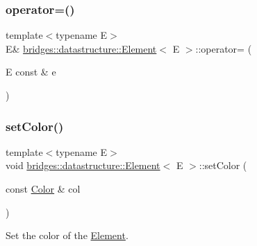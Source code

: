\mbox{\label{classbridges_1_1datastructure_1_1_element_a18ffc753328275e95bb1ee967f88a00a}} 
\subsubsection{\texorpdfstring{operator=()}{operator=()}\hspace{0.1cm}{\footnotesize\ttfamily [2/2]}}
{\footnotesize\ttfamily template$<$typename E$>$ \\
E\& \hyperlink{classbridges_1_1datastructure_1_1_element}{bridges\+::datastructure\+::\+Element}$<$ E $>$\+::operator= (\begin{DoxyParamCaption}\item[{E const \&}]{e }\end{DoxyParamCaption})\hspace{0.3cm}{\ttfamily [inline]}}

\mbox{\label{classbridges_1_1datastructure_1_1_element_a17d75aae50a48b3404f3c6811c62ae1c}} 
\subsubsection{\texorpdfstring{set\+Color()}{setColor()}\hspace{0.1cm}{\footnotesize\ttfamily [1/2]}}
{\footnotesize\ttfamily template$<$typename E$>$ \\
void \hyperlink{classbridges_1_1datastructure_1_1_element}{bridges\+::datastructure\+::\+Element}$<$ E $>$\+::set\+Color (\begin{DoxyParamCaption}\item[{const \hyperlink{classbridges_1_1datastructure_1_1_color}{Color} \&}]{col }\end{DoxyParamCaption})\hspace{0.3cm}{\ttfamily [inline]}}



Set the color of the \hyperlink{classbridges_1_1datastructure_1_1_element}{Element}. 


